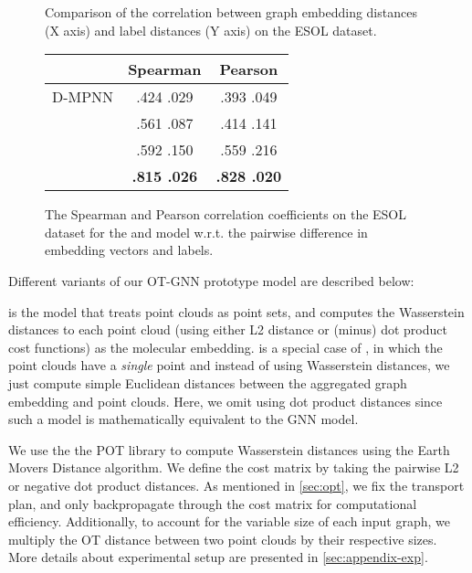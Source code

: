 \documentclass[letterpaper]{article} \usepackage{aaai22}  \usepackage{times}  \usepackage{helvet}  \usepackage{courier}  \usepackage[hyphens]{url}  \usepackage{graphicx} \urlstyle{rm} \def\UrlFont{\rm}  \usepackage{natbib}  \usepackage{caption} \DeclareCaptionStyle{ruled}{labelfont=normalfont,labelsep=colon,strut=off} \frenchspacing  \setlength{\pdfpagewidth}{8.5in}  \setlength{\pdfpageheight}{11in}  \usepackage{algorithm}
\begin{document}
\begin{figure}[t]
    \centering
  \caption{Comparison of the correlation between graph embedding distances (X axis) and label distances (Y axis) on the ESOL dataset.}\label{fig:r_coef}
\end{figure}

\begin{figure}\centering
  {\begin{tabular}{ |c|c|c| } 
 \hline
& Spearman  & Pearson   \\
 \hline
 D-MPNN & .424  .029 & .393  .049 \\ 
 \hline
  & .561  .087& .414  .141 \\ 
 \hline
  & .592  .150 & .559  .216  \\
 \hline
   & \textbf{.815  .026} & \textbf{.828  .020} \\
 \hline
 \end{tabular}
  }
{\caption{The Spearman and Pearson correlation coefficients on the ESOL dataset for the  and  model w.r.t. the pairwise difference in embedding vectors and labels.}\label{tab:2}}
\end{figure}

\par Different variants of our OT-GNN prototype model are described below: 

\noindent\textbf{} is the model that treats point clouds as point sets, and computes the Wasserstein distances to each point cloud (using either L2 distance or (minus) dot product cost functions) as the molecular embedding. \textbf{} is a special case of , in which the point clouds have a \textit{single} point and instead of using Wasserstein distances, we just compute simple Euclidean distances between the aggregated graph embedding and point clouds. Here, we omit using dot product distances since such a  model is mathematically equivalent to the GNN model.

We use the the POT library \citep{flamary2017pot} to compute Wasserstein distances using the Earth Movers Distance algorithm. We define the cost matrix by taking the pairwise L2 or negative dot product distances. As mentioned in \cref{sec:opt}, we fix the transport plan, and only backpropagate through the cost matrix for computational efficiency. Additionally, to account for the variable size of each input graph, we multiply the OT distance between two point clouds by their respective sizes. More details about experimental setup are presented in \cref{sec:appendix-exp}. 
\end{document}
